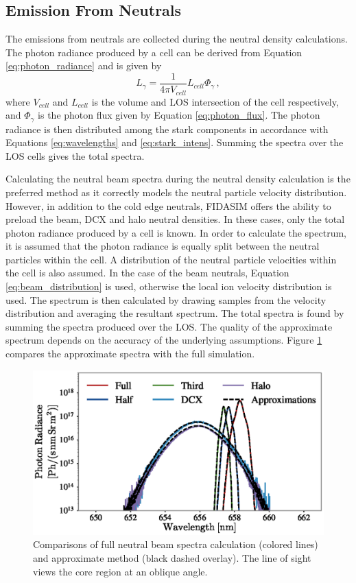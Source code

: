 \subsection{Emission From Neutrals}
The emissions from neutrals are collected during the neutral density calculations. The photon radiance produced by a cell can be derived from Equation \ref{eq:photon_radiance} and is given by
\begin{equation}\label{eq:cell_photon_radiance}
    L_\gamma = \frac{1}{4\pi V_{cell}} L_{cell} \Phi_\gamma\,,
\end{equation}
where $V_{cell}$ and $L_{cell}$ is the volume and LOS intersection of the cell respectively, and $\Phi_\gamma$ is the photon flux given by Equation \ref{eq:photon_flux}.
The photon radiance is then distributed among the stark components in accordance with Equations \ref{eq:wavelengths} and \ref{eq:stark_intens}. Summing the spectra over the LOS cells gives the total spectra.

Calculating the neutral beam spectra during the neutral density calculation is the preferred method as it correctly models the neutral particle velocity distribution. However, in addition to the cold edge neutrals, FIDASIM offers the ability to preload the beam, DCX and halo neutral densities. In these cases, only the total photon radiance produced by a cell is known. In order to calculate the spectrum, it is assumed that the photon radiance is equally split between the neutral particles within the cell. A distribution of the neutral particle velocities within the cell is also assumed. In the case of the beam neutrals, Equation \ref{eq:beam_distribution} is used, otherwise the local ion velocity distribution is used. The spectrum is then calculated by drawing samples from the velocity distribution and averaging the resultant spectrum. The total spectra is found by summing the spectra produced over the LOS. The quality of the approximate spectrum depends on the accuracy of the underlying assumptions. Figure \ref{fig:approx_spectra} compares the approximate spectra with the full simulation.
\begin{figure}[h!]
    \centering
    \includegraphics[width=12cm]{figures/approx_spectra.eps}
    \caption{Comparisons of full neutral beam spectra calculation (colored lines) and approximate method (black dashed overlay). The line of sight views the core region at an oblique angle.}
    \label{fig:approx_spectra}
\end{figure}

